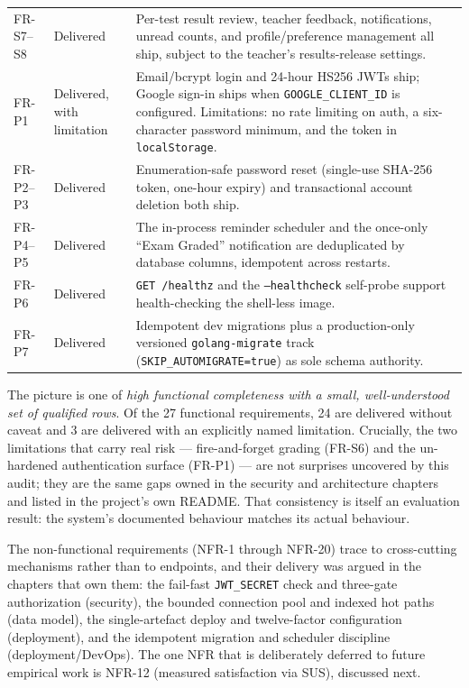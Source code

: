 \begin{table}[htbp]
\begin{tabularx}{\textwidth}{@{}L{1.5cm} L{2.9cm} X@{}}
FR-S7--S8 & Delivered & Per-test result review, teacher feedback, notifications,
unread counts, and profile/preference management all ship, subject to the teacher's
results-release settings. \\
\addlinespace
FR-P1 & Delivered, with limitation & Email/bcrypt login and 24-hour HS256 JWTs ship;
Google sign-in ships when \texttt{GOOGLE\_CLIENT\_ID} is configured. Limitations: no
rate limiting on auth, a six-character password minimum, and the token in
\texttt{localStorage}. \\
FR-P2--P3 & Delivered & Enumeration-safe password reset (single-use SHA-256 token,
one-hour expiry) and transactional account deletion both ship. \\
FR-P4--P5 & Delivered & The in-process reminder scheduler and the once-only ``Exam
Graded'' notification are deduplicated by database columns, idempotent across
restarts. \\
FR-P6 & Delivered & \texttt{GET /healthz} and the \texttt{--healthcheck} self-probe
support health-checking the shell-less image. \\
FR-P7 & Delivered & Idempotent dev migrations plus a production-only versioned
\texttt{golang-migrate} track (\texttt{SKIP\_AUTOMIGRATE=true}) as sole schema
authority. \\
\bottomrule
\end{tabularx}
\end{table}

The picture is one of \emph{high functional completeness with a small, well-understood
set of qualified rows}. Of the 27 functional requirements, 24 are delivered without
caveat and 3 are delivered with an explicitly named limitation. Crucially, the two
limitations that carry real risk --- fire-and-forget grading (FR-S6) and the
un-hardened authentication surface (FR-P1) --- are not surprises uncovered by this
audit; they are the same gaps owned in the security and architecture chapters and
listed in the project's own README. That consistency is itself an evaluation result:
the system's documented behaviour matches its actual behaviour.

The non-functional requirements (NFR-1 through NFR-20) trace to cross-cutting
mechanisms rather than to endpoints, and their delivery was argued in the chapters
that own them: the fail-fast \texttt{JWT\_SECRET} check and three-gate authorization
(security), the bounded connection pool and indexed hot paths (data model), the
single-artefact deploy and twelve-factor configuration~\cite{twelvefactor,distroless}
(deployment), and the idempotent migration and scheduler discipline
(deployment/DevOps). The one NFR that is deliberately deferred to future empirical
work is NFR-12 (measured satisfaction via SUS), discussed next.

